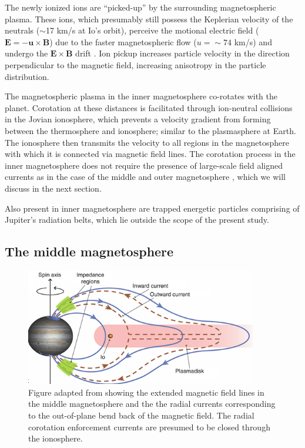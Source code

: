 The newly ionized ions are ``picked-up'' by the surrounding magnetospheric plasma. These ions, which presumably still possess the Keplerian velocity of the neutrals ($\sim$17 km/s at Io's orbit), perceive the motional electric field ($\mathbf{E} = -\mathbf{u} \times \mathbf{B}$) due to the faster magnetospheric flow ($u=\sim74$ km/s) and undergo the $\mathbf{E} \times \mathbf{B}$ drift \cite{Russell2005InteractionEnvironments}. Ion pickup increases particle velocity in the direction perpendicular to the magnetic field, increasing anisotropy in the particle distribution. 

The magnetospheric plasma in the inner magnetosphere co-rotates with the planet. Corotation at these distances is facilitated through ion-neutral collisions in the Jovian ionosphere, which prevents a velocity gradient from forming between the thermosphere and ionosphere; similar to the plasmasphere at Earth. The ionosphere then transmits the velocity to all regions in the magnetosphere with which it is connected via magnetic field lines. The corotation process in the inner magnetosphere does not require the presence of large-scale field aligned currents as in the case of the middle and outer magnetosphere \cite{Vasyliunas1983a}, which we will discuss in the next section.

Also present in inner magnetosphere are trapped energetic particles comprising of Jupiter's radiation belts, which lie outside the scope of the present study. 

\subsection{The middle magnetosphere}

\begin{figure}
    \centering
    \includegraphics[width=0.9\textwidth]{images1/corotation-schematic.png}
    \caption{Figure adapted from \protect{} showing the extended magnetic field lines in the middle magnetosphere and the the radial currents corresponding to the out-of-plane bend back of the magnetic field. The radial corotation enforcement currents are presumed to be closed through the ionosphere.}
    \label{fig:corotation-schematic}
\end{figure}

